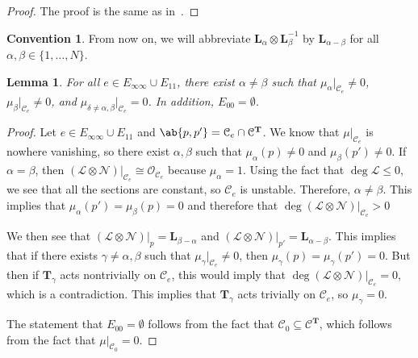 \documentclass{amsart}
\newtheorem{lem}[thm]{Lemma}
\theoremstyle{definition}
\newtheorem{conv}[thm]{Convention}
\theoremstyle{remark}
\theoremstyle{plain}
\theoremstyle{definition}
\theoremstyle{remark}
\newcommand{\T}{\mathbf{T}}
\newcommand{\mc}[1]{\mathcal{#1}}
\newcommand{\mbf}[1]{\mathbf{#1}}
\newcommand{\1}{\mathbf{1}}
\newcommand{\2}{\mathbf{2}}
\newcommand{\3}{\mathbf{3}}
\begin{document}
\begin{proof}
    The proof is the same as in~\cite[Lemma 4.4]{nmsp}.
\end{proof}

\begin{conv}
    From now on, we will abbreviate $\mbf{L}_{\alpha} \otimes \mbf{L}_{\beta}^{-1}$ by $\mbf{L}_{\alpha - \beta}$ for all $\alpha, \beta \in \{1, \ldots, N\}$.
\end{conv}


\begin{lem}
    For all $e \in E_{\infty\infty} \cup E_{11}$, there exist $\alpha \neq \beta$ such that $\mu_{\alpha}|_{\mc{C}_e} \neq 0$, $\mu_{\beta}|_{\mc{C}_e} \neq 0$, and $\mu_{\delta \neq \alpha,\beta}|_{\mc{C}_e} = 0$. In addition, $E_{00} = \emptyset$.
\end{lem}

\begin{proof}
    Let $e \in E_{\infty\infty} \cup E_{11}$ and $\ab\{ p, p' \} = \mc{C}_e \cap \mc{C}^{\T}$. We know that $\mu|_{\mc{C}_e}$ is nowhere vanishing, so there exist $\alpha, \beta$ such that $\mu_{\alpha}(p) \neq 0$ and $\mu_{\beta}(p') \neq 0$. If $\alpha = \beta$, then $(\mc{L} \otimes \mc{N})|_{\mc{C}_e} \cong \mc{O}_{\mc{C}_e}$ because $\mu_{\alpha} = 1$. Using the fact that $\deg \mc{L} \leq 0$, we see that all the sections are constant, so $\mc{C}_e$ is unstable. Therefore, $\alpha \neq \beta$. This implies that $\mu_{\alpha}(p') = \mu_{\beta}(p) = 0$ and therefore that $\deg (\mc{L} \otimes \mc{N})|_{\mc{C}_e} > 0$

    We then see that $( \mc{L} \otimes \mc{N} )|_p = \mbf{L}_{\beta - \alpha}$ and $(\mc{L} \otimes \mc{N})|_{p'} = \mbf{L}_{\alpha - \beta}$. This implies that if there exists $\gamma \neq \alpha,\beta$ such that $\mu_{\gamma}|_{\mc{C}_e} \neq 0$, then $\mu_{\gamma}(p) = \mu_{\gamma}(p') = 0$. But then if $\T_{\gamma}$ acts nontrivially on $\mc{C}_e$, this would imply that $\deg ( \mc{L} \otimes \mc{N} )|_{\mc{C}_e} = 0$, which is a contradiction. This implies that $\T_{\gamma}$ acts trivially on $\mc{C}_e$, so $\mu_{\gamma} = 0$.

    The statement that $E_{00} = \emptyset$ follows from the fact that $\mc{C}_0 \subseteq \mc{C}^{\T}$, which follows from the fact that $\mu|_{\mc{C}_0} = 0$.
\end{proof}
\end{document}
